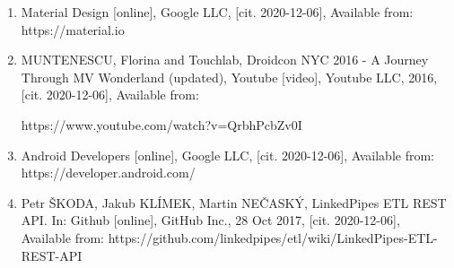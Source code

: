 
\begin{enumerate}
    \item Material Design [online], Google LLC, [cit. 2020-12-06], Available from: https://material.io
    \item MUNTENESCU, Florina and Touchlab, Droidcon NYC 2016 - A Journey Through MV Wonderland (updated), Youtube [video], Youtube LLC, 2016, [cit. 2020-12-06], Available from:
    
    https://www.youtube.com/watch?v=QrbhPcbZv0I
    \item Android Developers [online], Google LLC, [cit. 2020-12-06], Available from: https://developer.android.com/
    \item Petr ŠKODA, Jakub KLÍMEK, Martin NEČASKÝ, LinkedPipes ETL REST API. In: Github [online], GitHub Inc., 28 Oct 2017, [cit. 2020-12-06], Available from: https://github.com/linkedpipes/etl/wiki/LinkedPipes-ETL-REST-API
\end{enumerate}